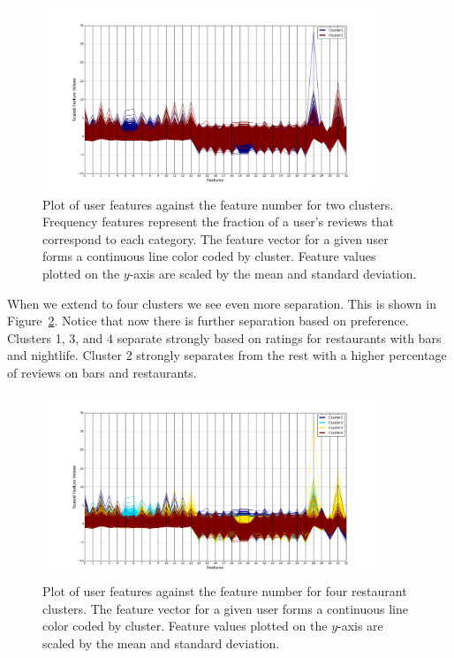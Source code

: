 \documentclass[11pt]{article}
\begin{document}
\begin{figure}[h!]
	\centering
	\includegraphics[width=0.9\textwidth]{kmeans2clusters_all.png}
	\caption{Plot of user features against the feature number for two clusters. Frequency features represent the fraction of a user's reviews that correspond to each category. The feature vector for a given user forms a continuous line color coded by cluster. Feature values plotted on the $y$-axis are scaled by the mean and standard deviation.}
	\label{fig:better_clustering}
\end{figure} 

When we extend to four clusters we see even more separation. This is shown in Figure~\ref{fig:kmeans_4}. Notice that now there is further separation based on preference. Clusters 1, 3, and 4 separate strongly based on ratings for restaurants with bars and nightlife. Cluster 2 strongly separates from the rest with a higher percentage of reviews on bars and restaurants.

\begin{figure}[h!]
	\centering
	\includegraphics[width=0.9\textwidth]{kmeans4clusters_all.png}
	\caption{Plot of user features against the feature number for four restaurant clusters. The feature vector for a given user forms a continuous line color coded by cluster. Feature values plotted on the $y$-axis are scaled by the mean and standard deviation.}
	\label{fig:kmeans_4}
\end{figure}
\end{document}
